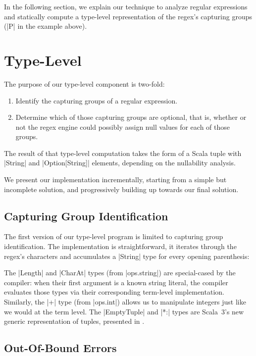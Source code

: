 In the following section, we explain our technique to analyze regular expressions and statically compute a type-level representation of the regex's capturing groups (|P| in the example above).

\section{Type-Level}
\label{sec:type-level}

The purpose of our type-level component is two-fold:

\begin{enumerate}
  \item Identify the capturing groups of a regular expression.
  \item Determine which of those capturing groups are optional, that is, whether or not the regex engine could possibly assign null values for each of those groups.
\end{enumerate}

\noindent
The result of that type-level computation takes the form of a Scala tuple with |String| and |Option[String]| elements, depending on the nullability analysis.

We present our implementation incrementally, starting from a simple but incomplete solution, and progressively building up towards our final solution.

\subsection{Capturing Group Identification}

The first version of our type-level program is limited to capturing group identification.
The implementation is straightforward, it iterates through the regex's characters and accumulates a |String| type for every opening parenthesis:

\regexFirstIteration

\noindent
The |Length| and |CharAt| types (from |ops.string|) are special-cased by the compiler: when their first argument is a known string literal, the compiler evaluates those types via their corresponding term-level implementation.
Similarly, the |+| type (from |ops.int|) allows us to manipulate integers just like we would at the term level.
The |EmptyTuple| and |*:| types are Scala~3's new generic representation of tuples, presented in .

\subsection{Out-Of-Bound Errors}


